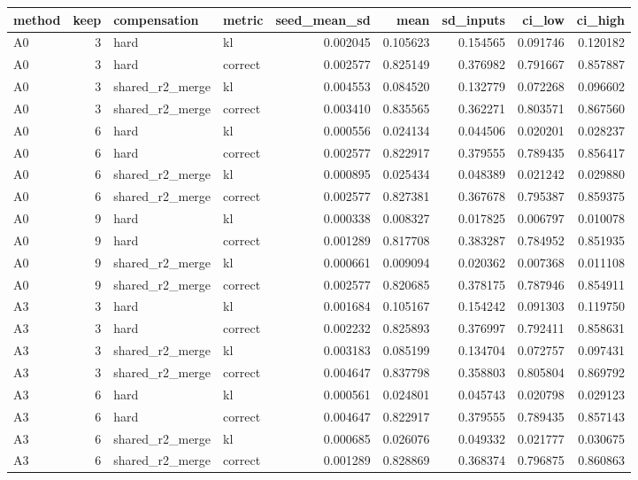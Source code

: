 \begin{tabular}{lrllrrrrr}
\toprule
method & keep & compensation & metric & seed_mean_sd & mean & sd_inputs & ci_low & ci_high \\
\midrule
A0 & 3 & hard & kl & 0.002045 & 0.105623 & 0.154565 & 0.091746 & 0.120182 \\
A0 & 3 & hard & correct & 0.002577 & 0.825149 & 0.376982 & 0.791667 & 0.857887 \\
A0 & 3 & shared_r2_merge & kl & 0.004553 & 0.084520 & 0.132779 & 0.072268 & 0.096602 \\
A0 & 3 & shared_r2_merge & correct & 0.003410 & 0.835565 & 0.362271 & 0.803571 & 0.867560 \\
A0 & 6 & hard & kl & 0.000556 & 0.024134 & 0.044506 & 0.020201 & 0.028237 \\
A0 & 6 & hard & correct & 0.002577 & 0.822917 & 0.379555 & 0.789435 & 0.856417 \\
A0 & 6 & shared_r2_merge & kl & 0.000895 & 0.025434 & 0.048389 & 0.021242 & 0.029880 \\
A0 & 6 & shared_r2_merge & correct & 0.002577 & 0.827381 & 0.367678 & 0.795387 & 0.859375 \\
A0 & 9 & hard & kl & 0.000338 & 0.008327 & 0.017825 & 0.006797 & 0.010078 \\
A0 & 9 & hard & correct & 0.001289 & 0.817708 & 0.383287 & 0.784952 & 0.851935 \\
A0 & 9 & shared_r2_merge & kl & 0.000661 & 0.009094 & 0.020362 & 0.007368 & 0.011108 \\
A0 & 9 & shared_r2_merge & correct & 0.002577 & 0.820685 & 0.378175 & 0.787946 & 0.854911 \\
A3 & 3 & hard & kl & 0.001684 & 0.105167 & 0.154242 & 0.091303 & 0.119750 \\
A3 & 3 & hard & correct & 0.002232 & 0.825893 & 0.376997 & 0.792411 & 0.858631 \\
A3 & 3 & shared_r2_merge & kl & 0.003183 & 0.085199 & 0.134704 & 0.072757 & 0.097431 \\
A3 & 3 & shared_r2_merge & correct & 0.004647 & 0.837798 & 0.358803 & 0.805804 & 0.869792 \\
A3 & 6 & hard & kl & 0.000561 & 0.024801 & 0.045743 & 0.020798 & 0.029123 \\
A3 & 6 & hard & correct & 0.004647 & 0.822917 & 0.379555 & 0.789435 & 0.857143 \\
A3 & 6 & shared_r2_merge & kl & 0.000685 & 0.026076 & 0.049332 & 0.021777 & 0.030675 \\
A3 & 6 & shared_r2_merge & correct & 0.001289 & 0.828869 & 0.368374 & 0.796875 & 0.860863 \\

\end{tabular}
